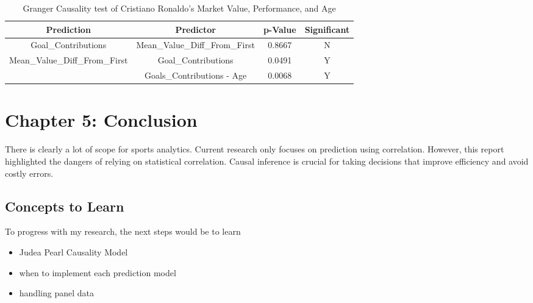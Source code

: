 \documentclass[
  english,
  doc,floatsintext]{apa6}
\providecommand{\tightlist}{%
  \setlength{\itemsep}{0pt}\setlength{\parskip}{0pt}}
\begin{document}
\begin{table}[H]
  \begin{center}
  \begin{tabular}{|c|c|c|c|}
  \hline
  \textbf{Prediction}                             & \textbf{Predictor}             & \textbf{p-Value} & Significant \\ \hline
  Goal\_Contributions                             & Mean\_Value\_Diff\_From\_First & 0.8667           & N          \\ \hline
  \multirow{2}{*}{Mean\_Value\_Diff\_From\_First} & Goal\_Contributions            & 0.0491           & Y           \\ \cline{2-4} 
                                                  & Goals\_Contributions - Age     & 0.0068           & Y           \\ \hline
  \end{tabular}
  \end{center}
  
  \captionsetup{justification=centering}
  \caption{Granger Causality test of Cristiano Ronaldo's Market Value, Performance, and Age}
\end{table}

\newpage

\hypertarget{chapter-5-conclusion}{%
\section{Chapter 5: Conclusion}\label{chapter-5-conclusion}}

There is clearly a lot of scope for sports analytics. Current research only focuses on prediction using correlation. However, this report highlighted the dangers of relying on statistical correlation. Causal inference is crucial for taking decisions that improve efficiency and avoid costly errors.

\hypertarget{concepts-to-learn}{%
\subsection{Concepts to Learn}\label{concepts-to-learn}}

To progress with my research, the next steps would be to learn

\begin{itemize}
\tightlist
\item
  Judea Pearl Causality Model
\item
  when to implement each prediction model
\item
  handling panel data
\end{itemize}
\end{document}
